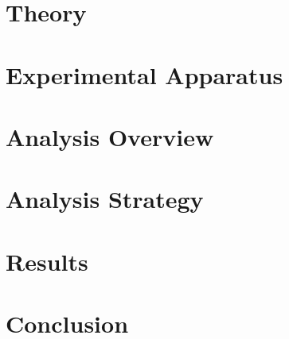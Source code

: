 \documentclass{brandeis-dissertation3.14}
\begin{document}
\chapter{Theory}
\label{chap:theory}


\chapter{Experimental Apparatus}
\label{chap:experiment}


\chapter{Analysis Overview}
\label{chap:ana_overview}


\chapter{Analysis Strategy}
\label{chap:ana_strategy}


\chapter{Results}
\label{chap:results}


\chapter{Conclusion}
\label{chap:conclusion}


\printbibliography

% 
\end{document}
